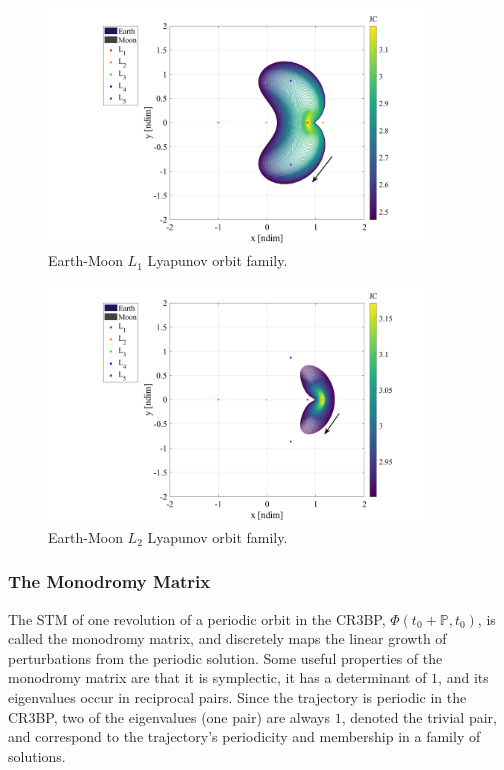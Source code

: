 \begin{figure}[H]
    \centering
    \includegraphics[width=0.9\textwidth]{figures/L1LyapunovFamily.pdf}
    \caption{Earth-Moon $L_{1}$ Lyapunov orbit family.}
    \label{fig:L1Lyapunov}
\end{figure}

\begin{figure}[H]
    \centering
    \includegraphics[width=0.9\textwidth]{figures/L2LyapunovFamily.pdf}
    \caption{Earth-Moon $L_{2}$ Lyapunov orbit family.}
    \label{fig:L2Lyapunov}
\end{figure}

\subsubsection{The Monodromy Matrix}
The STM of one revolution of a periodic orbit in the CR3BP, $\Phi(t_{0}+\mathbb{P},t_{0})$, is
called the monodromy matrix, and discretely maps the linear growth of perturbations from the
periodic solution. Some useful properties of the monodromy matrix are that it is symplectic, it has
a determinant of $1$, and its eigenvalues occur in reciprocal pairs\cite{ZimovanSpreen:2021}. Since
the trajectory is periodic in the CR3BP, two of the eigenvalues (one pair) are always $1$, denoted
the trivial pair, and correspond to the trajectory's periodicity and membership in a family of
solutions.

